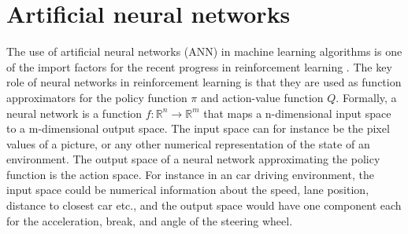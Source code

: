 \documentclass[class=book, crop=false, 11pt]{standalone}
\begin{document}
\section{Artificial neural networks}
The use of artificial neural networks (ANN) in machine learning algorithms is one of the import factors for the recent progress in reinforcement learning \cite{Sutton1998}. The key role of neural networks in reinforcement learning is that they are used as function approximators for the policy function $\pi$ and action-value function $Q$. Formally, a neural network is a function $f: \mathbb{R}^{n} \to \mathbb{R}^{m}$ that maps a n-dimensional input space to a m-dimensional output space. The input space can for instance be the pixel values of a picture, or any other numerical representation of the state of an environment. The output space of a neural network approximating the policy function is the action space. For instance in an car driving environment, the input space could be numerical information about the speed, lane position, distance to closest car etc., and the output space would have one component each for the acceleration, break, and angle of the steering wheel.
\end{document}
